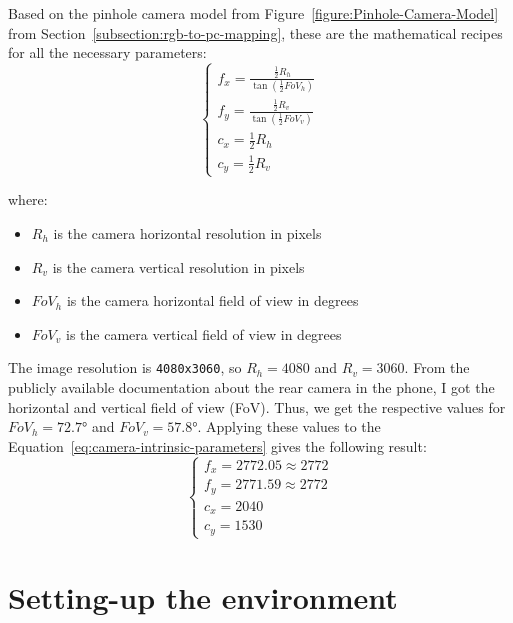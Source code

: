 Based on the pinhole camera model from Figure~\ref{figure:Pinhole-Camera-Model}
from Section~\ref{subsection:rgb-to-pc-mapping},
these are the mathematical recipes for all the necessary parameters:
\begin{equation} \label{eq:camera-intrinsic-parameters}
\begin{cases}
  f_x = \frac{\frac{1}{2}R_h}{\tan(\frac{1}{2}FoV_h)} \\
  f_y = \frac{\frac{1}{2}R_v}{\tan(\frac{1}{2}FoV_v)} \\
  c_x = \frac{1}{2}R_h \\
  c_y = \frac{1}{2}R_v
\end{cases}
\end{equation}

where:
\begin{itemize}
  \item $R_h$ is the camera horizontal resolution in pixels
  \item $R_v$ is the camera vertical resolution in pixels
  \item $FoV_h$ is the camera horizontal field of view in degrees
  \item $FoV_v$ is the camera vertical field of view in degrees
\end{itemize}

The image resolution is \texttt{4080x3060}, so $R_h = 4080$ and $R_v = 3060$.
From the publicly available documentation about the rear camera in the phone,
I got the horizontal and vertical field of view (FoV). \cite{camera-fv-5-samsung-a54}
Thus, we get the respective values for $FoV_h = \ang{72.7}$ and $FoV_v = \ang{57.8}$.
Applying these values to the Equation~\ref{eq:camera-intrinsic-parameters} gives the following result:
\begin{equation} \label{eq:camera-intrinsic-parameters-solved}
\begin{cases}
  f_x = 2772.05 \approx 2772 \\
  f_y = 2771.59 \approx 2772 \\
  c_x = 2040 \\
  c_y = 1530
\end{cases}
\end{equation}

\section{Setting-up the environment}

